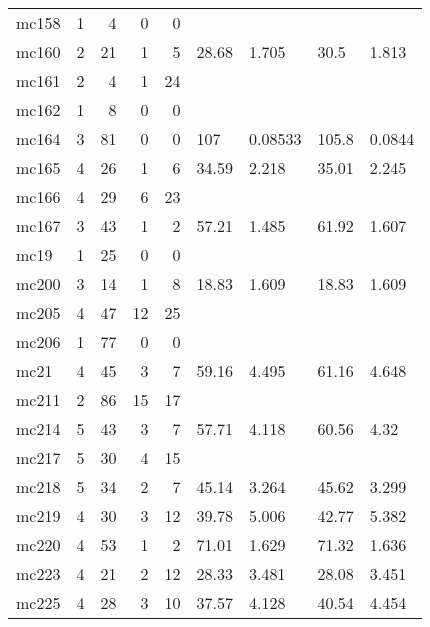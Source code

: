 \documentclass{article}
\begin{document}
\begin{longtable}{lrrrrllll}
 mc158 &  1 &   4 &        0 &          0 &        &            &        &           \\
 mc160 &  2 &  21 &        1 &          5 &  28.68 &      1.705 &   30.5 &     1.813 \\
 mc161 &  2 &   4 &        1 &         24 &        &            &        &           \\
 mc162 &  1 &   8 &        0 &          0 &        &            &        &           \\
 mc164 &  3 &  81 &        0 &          0 &    107 &    0.08533 &  105.8 &    0.0844 \\
 mc165 &  4 &  26 &        1 &          6 &  34.59 &      2.218 &  35.01 &     2.245 \\
 mc166 &  4 &  29 &        6 &         23 &        &            &        &           \\
 mc167 &  3 &  43 &        1 &          2 &  57.21 &      1.485 &  61.92 &     1.607 \\
  mc19 &  1 &  25 &        0 &          0 &        &            &        &           \\
 mc200 &  3 &  14 &        1 &          8 &  18.83 &      1.609 &  18.83 &     1.609 \\
 mc205 &  4 &  47 &       12 &         25 &        &            &        &           \\
 mc206 &  1 &  77 &        0 &          0 &        &            &        &           \\
  mc21 &  4 &  45 &        3 &          7 &  59.16 &      4.495 &  61.16 &     4.648 \\
 mc211 &  2 &  86 &       15 &         17 &        &            &        &           \\
 mc214 &  5 &  43 &        3 &          7 &  57.71 &      4.118 &  60.56 &      4.32 \\
 mc217 &  5 &  30 &        4 &         15 &        &            &        &           \\
 mc218 &  5 &  34 &        2 &          7 &  45.14 &      3.264 &  45.62 &     3.299 \\
 mc219 &  4 &  30 &        3 &         12 &  39.78 &      5.006 &  42.77 &     5.382 \\
 mc220 &  4 &  53 &        1 &          2 &  71.01 &      1.629 &  71.32 &     1.636 \\
 mc223 &  4 &  21 &        2 &         12 &  28.33 &      3.481 &  28.08 &     3.451 \\
 mc225 &  4 &  28 &        3 &         10 &  37.57 &      4.128 &  40.54 &     4.454 \\

\end{longtable}
\end{document}
